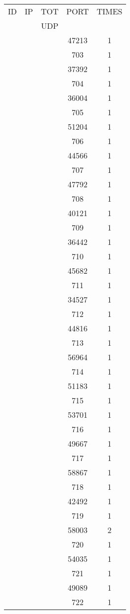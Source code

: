 \documentclass[a4paper]{scrartcl}
\begin{document}
\begin{minipage}[b]{0.5\linewidth}
\begin{tabular}{| c | c | c | c | c |}
\hline
ID & IP & TOT & PORT & TIMES \\ 
   &    & UDP &      &       \\ 
\hline
& & & 47213 & 1 \\ & & & 703 & 1 \\ & & & 37392 & 1 \\ & & & 704 & 1 \\ & & & 36004 & 1 \\ & & & 705 & 1 \\ & & & 51204 & 1 \\ & & & 706 & 1 \\ & & & 44566 & 1 \\ & & & 707 & 1 \\ & & & 47792 & 1 \\ & & & 708 & 1 \\ & & & 40121 & 1 \\ & & & 709 & 1 \\ & & & 36442 & 1 \\ & & & 710 & 1 \\ & & & 45682 & 1 \\ & & & 711 & 1 \\ & & & 34527 & 1 \\ & & & 712 & 1 \\ & & & 44816 & 1 \\ & & & 713 & 1 \\ & & & 56964 & 1 \\ & & & 714 & 1 \\ & & & 51183 & 1 \\ & & & 715 & 1 \\ & & & 53701 & 1 \\ & & & 716 & 1 \\ & & & 49667 & 1 \\ & & & 717 & 1 \\ & & & 58867 & 1 \\ & & & 718 & 1 \\ & & & 42492 & 1 \\ & & & 719 & 1 \\ & & & 58003 & 2 \\ & & & 720 & 1 \\ & & & 54035 & 1 \\ & & & 721 & 1 \\ & & & 49089 & 1 \\ & & & 722 & 1 \\ \hline\end{tabular}\end{minipage} \hfill\begin{minipage}[b]{0.5\linewidth}\begin{tabular}{| c | c | c | c | c |}

\end{tabular}
\end{minipage}
\end{document}
